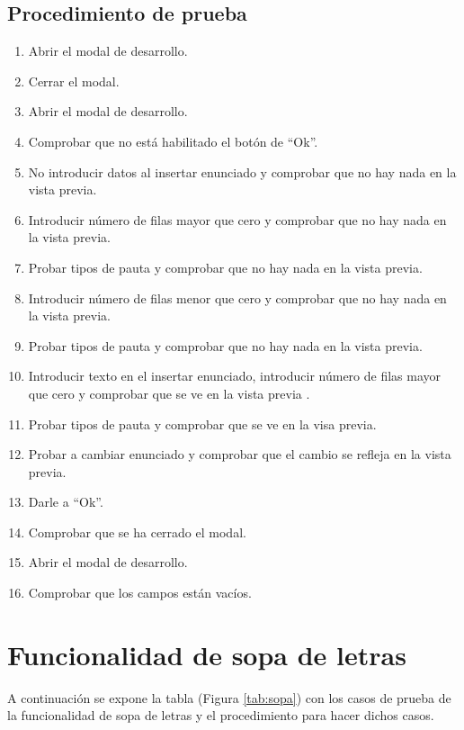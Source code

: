 \subsection{Procedimiento de prueba}
\label{procedimientoPruebas:desarrollo}
\begin{enumerate}
    \item Abrir el modal de desarrollo.
    \item Cerrar el modal.
    \item Abrir el modal de desarrollo.
    \item Comprobar que no está habilitado el botón de ``Ok''.
    \item No introducir datos al insertar enunciado y comprobar que no hay nada en la vista previa.
    \item Introducir número de filas mayor que cero y comprobar que no hay nada en la vista previa.
    \item Probar tipos de pauta y comprobar que no hay nada en la vista previa.
    \item Introducir número de filas menor que cero y comprobar que no hay nada en la vista previa.
    \item Probar tipos de pauta y comprobar que no hay nada en la vista previa.
    \item Introducir texto en el insertar enunciado, introducir número de filas mayor que cero y comprobar que se ve en la vista previa .
    \item Probar tipos de pauta y comprobar que se ve en la visa previa.
    \item Probar a cambiar enunciado y comprobar que el cambio se refleja en la vista previa.
    \item Darle a ``Ok''.
    \item Comprobar que se ha cerrado el modal.
    \item Abrir el modal de desarrollo.
    \item Comprobar que los campos están vacíos.
\end{enumerate}

\section{Funcionalidad de sopa de letras}
\label{planPruebas:sopa}
A continuación se expone la tabla (Figura \ref{tab:sopa}) con los casos de prueba de la funcionalidad de sopa de letras y el procedimiento para hacer dichos casos.

